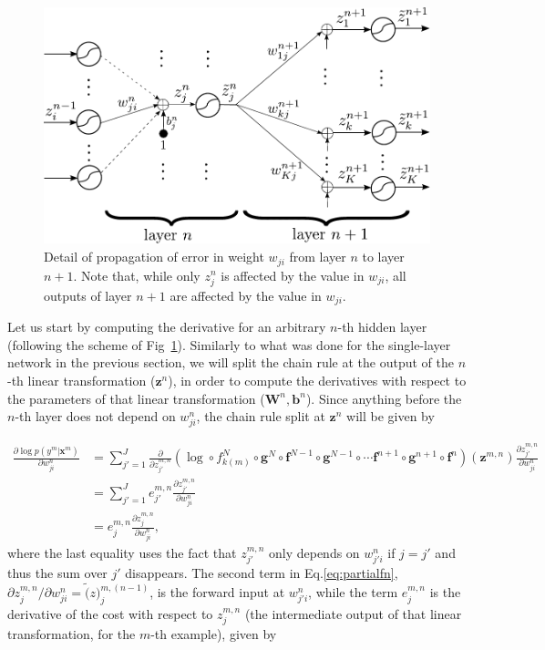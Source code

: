 \begin{figure}
\centering
\includegraphics[scale=0.6]{figs/deep_learning/LayerP2_mla.pdf}
\caption{Detail of propagation of error in weight $w_{ji}$ from layer $n$ to
layer $n+1$. Note that, while only $z_j^n$ is affected by the value in $w_{ji}$, all outputs
of layer $n+1$ are affected by the value in $w_{ji}$.
}
\label{fig:LayerP2}
\end{figure}

Let us start by computing the derivative for an arbitrary $n$-th hidden layer (following the scheme of Fig~\ref{fig:LayerP2}). Similarly to what was done for the single-layer network in the previous section, we will
split the chain rule at the output of the $n$-th linear transformation ($\mathbf{z}^n$), in order to compute the derivatives with respect to the parameters of that linear transformation ($\mathbf{W}^n, \mathbf{b}^n$). Since anything before the $n$-th layer does not depend on $w_{ji}^n$, the chain rule split at $\mathbf{z}^n$ will be given by

\begin{align}
\frac{\partial \log p(y^m | \mathbf{x}^m)}{\partial w_{ji}^n} & = \sum_{j'=1}^J \frac{\partial}{\partial z^{m,n}_{j'}} (\log \circ f_{k(m)}^N \circ \mathbf{g}^N \circ \mathbf{f}^{N-1} \circ \mathbf{g}^{N-1} \circ \cdots \mathbf{f}^{n+1} \circ \mathbf{g}^{n+1} \circ \mathbf{f}^{n})(\mathbf{z}^{m,n})\frac{\partial z^{m,n}_{j'}}{\partial w_{ji}^n}\nonumber\\ & = \sum_{j'=1}^J e^{m,n}_{j'} \frac{\partial z^{m,n}_{j'}}{\partial w_{ji}^n}\nonumber\\ & = e^{m,n}_{j}\frac{\partial z^{m,n}_{j}}{\partial w_{ji}^n},
\label{eq:partialfn}
\end{align}
%
where the last equality uses the fact that $z^{m,n}_{j'}$ only depends on
$w_{j'i}^n$ if $j=j'$ and thus the sum over $j'$ disappears. The second term in Eq.\ref{eq:partialfn}, ${\partial z^{m,n}_{j}}/{\partial w_{ji}^n}=\tilde(z)_{j}^{m,(n-1)}$, is the forward input at $w_{j'i}^n$, while the term $e^{m,n}_j$
is the derivative of the cost with respect to ${z}^{m,n}_j$ (the intermediate output of that linear transformation, for the $m$-th example),  given by

